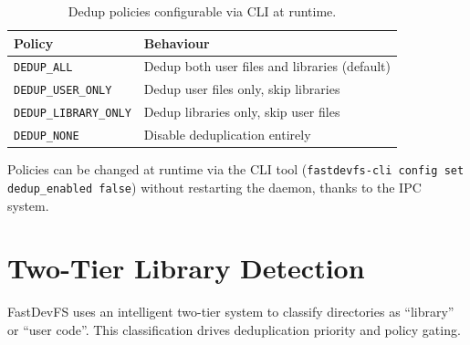 \documentclass[12pt, a4paper]{article}
\begin{document}
\begin{table}[H]
\centering
\begin{tabular}{ll}
\toprule
\textbf{Policy} & \textbf{Behaviour} \\
\midrule
\texttt{DEDUP\_ALL} & Dedup both user files and libraries (default) \\
\texttt{DEDUP\_USER\_ONLY} & Dedup user files only, skip libraries \\
\texttt{DEDUP\_LIBRARY\_ONLY} & Dedup libraries only, skip user files \\
\texttt{DEDUP\_NONE} & Disable deduplication entirely \\
\bottomrule
\end{tabular}
\caption{Dedup policies configurable via CLI at runtime.}
\end{table}

Policies can be changed at runtime via the CLI tool (\texttt{fastdevfs-cli config set dedup\_enabled false}) without restarting the daemon, thanks to the IPC system.

\section{Two-Tier Library Detection}

FastDevFS uses an intelligent two-tier system to classify directories as ``library'' or ``user code''. This classification drives deduplication priority and policy gating.
\end{document}
